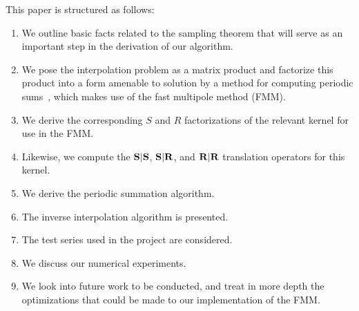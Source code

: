 This paper is structured as follows:
\begin{enumerate}
\item We outline basic facts related to the sampling theorem that
  will serve as an important step in the derivation of our algorithm.
\item We pose the interpolation problem as a matrix product and
  factorize this product into a form amenable to solution by a method
  for computing periodic sums~\cite{Gumerov13amethod}, which makes use
  of the fast multipole method (FMM).
\item We derive the corresponding $S$ and $R$ factorizations of the
  relevant kernel for use in the FMM.
\item Likewise, we compute the $\bold{S}|\bold{S}$, $\bold{S}|\bold{R}$, and $\bold{R}|\bold{R}$ translation
  operators for this kernel.
\item We derive the periodic summation algorithm.
\item The inverse interpolation algorithm is presented.
\item The test series used in the project are considered.
\item We discuss our numerical experiments.
\item We look into future work to be conducted, and treat in more
  depth the optimizations that could be made to our implementation of
  the FMM.
\end{enumerate}